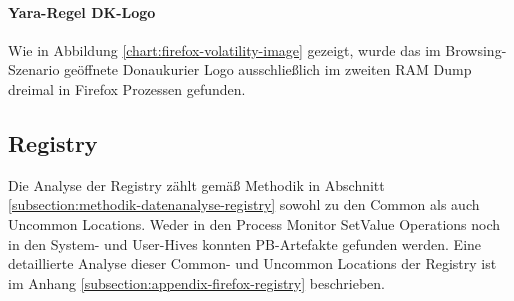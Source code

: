 \paragraph*{Yara-Regel \glqq{}DK-Logo\grqq{}}
Wie in Abbildung \ref{chart:firefox-volatility-image} gezeigt, wurde das im Browsing-Szenario geöffnete Donaukurier Logo ausschließlich im zweiten RAM Dump dreimal in Firefox Prozessen gefunden.
\begin{table}[h!]
	\label{chart:firefox-volatility-image}
\end{table}




\subsection*{Registry}
\label{subsection:ergebnisse-firefox-registry}
Die Analyse der Registry zählt gemäß Methodik in Abschnitt \ref{subsection:methodik-datenanalyse-registry} sowohl zu den Common als auch Uncommon Locations. Weder in den Process Monitor \glqq{}SetValue\grqq{} Operations noch in den System- und User-Hives konnten PB-Artefakte gefunden werden. Eine detaillierte Analyse dieser Common- und Uncommon Locations der Registry ist im Anhang \ref{subsection:appendix-firefox-registry} beschrieben.


